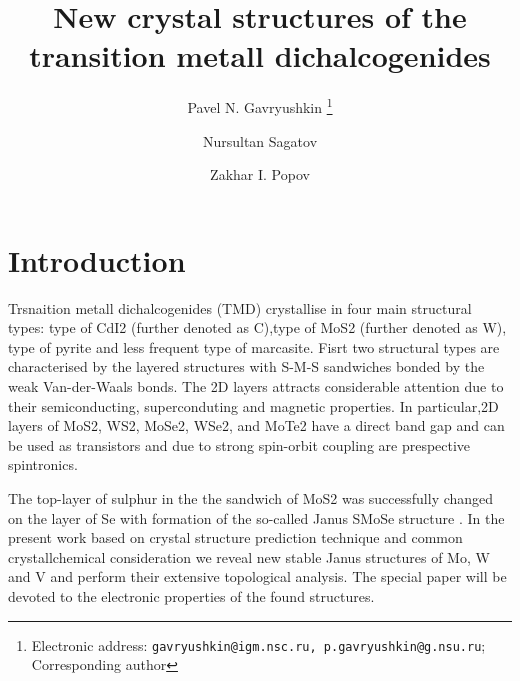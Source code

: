 \documentclass[a4paperm]{article}
\begin{document}

\title{New crystal structures of the transition metall dichalcogenides}


\author[1,2]{Pavel N. Gavryushkin
   \thanks{Electronic address: \texttt{gavryushkin@igm.nsc.ru, p.gavryushkin@g.nsu.ru}; Corresponding author}}     
\author[1]{Nursultan Sagatov}
\author[3]{Zakhar I. Popov}


\date{}
\maketitle


\begin{abstract}
\end{abstract}

\section*{Introduction}
Trsnaition metall dichalcogenides (TMD) crystallise in four main structural types: type of CdI2 (further denoted as C),type of MoS2 (further denoted as W), type of pyrite and less frequent type of marcasite.
Fisrt two structural types are characterised by the layered structures with S-M-S sandwiches bonded by the weak Van-der-Waals bonds. 
The 2D layers attracts considerable attention due to their semiconducting, superconduting and magnetic properties.
In particular,2D layers of MoS2, WS2, MoSe2, WSe2, and MoTe2 have a direct band gap and can be used as transistors and due to strong spin-orbit coupling are prespective spintronics.

The top-layer of sulphur in the the sandwich of MoS2 was successfully changed on the layer of Se with formation of the so-called Janus SMoSe structure  \cite{lu2017}.
In the present work based on crystal structure prediction technique and common crystallchemical consideration we reveal new stable Janus structures of Mo, W and V and perform their extensive topological analysis.
The special paper will be devoted to the electronic properties of the found structures.
\end{document}
